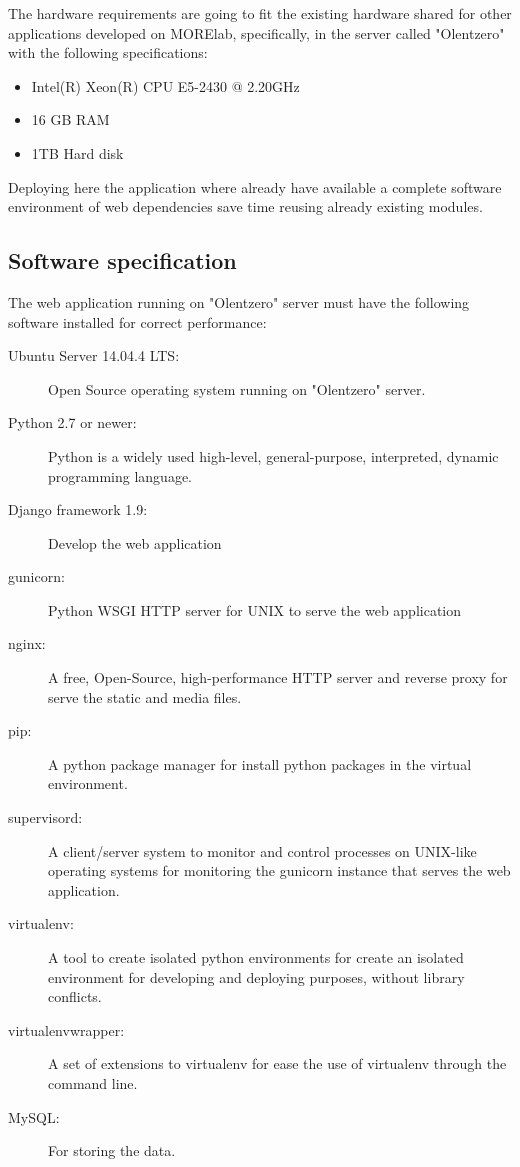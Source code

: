 \documentclass{DeustoFDP}
\begin{document}
The hardware requirements are going to fit the existing hardware shared for other applications developed on MORElab, specifically, in the server called "Olentzero" with the following specifications:

\begin{itemize}
	\item Intel(R) Xeon(R) CPU E5-2430 @ 2.20GHz
	\item 16 GB RAM
	\item 1TB Hard disk
\end{itemize}

Deploying here the application where already have available a complete software environment of web dependencies save time reusing already existing modules.

\subsection{Software specification}
The web application running on "Olentzero" server must have the following software installed for correct performance:

\begin{description}
	\item[Ubuntu Server 14.04.4 LTS:] Open Source operating system running on "Olentzero" server.
	\item[Python 2.7 or newer:] Python is a widely used high-level, general-purpose, interpreted, dynamic programming language.
	\item[Django framework 1.9:] Develop the web application
	\item[gunicorn:] Python WSGI HTTP server for UNIX to serve the web application
	\item[nginx:] A free, Open-Source, high-performance HTTP server and reverse proxy for serve the static and media files.
	\item[pip:] A python package manager for install python packages in the virtual environment.
	\item[supervisord:] A client/server system to monitor and control processes on UNIX-like operating systems for monitoring the gunicorn instance that serves the web application.
	\item[virtualenv:] A tool to create isolated python environments for create an isolated environment for developing and deploying purposes, without library conflicts.
	\item[virtualenvwrapper:] A set of extensions to virtualenv for ease the use of virtualenv through the command line.
	\item[MySQL:] For storing the data.
\end{description}
\end{document}
